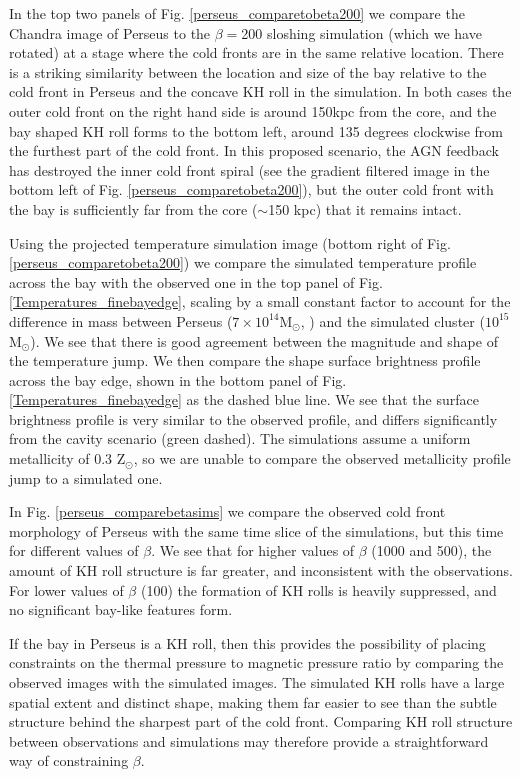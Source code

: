 \documentclass[useAMS,usenatbib]{mn2e}
\begin{document}
In the top two panels of Fig. \ref{perseus_comparetobeta200} we compare the
Chandra image of Perseus to the $\beta=$200 sloshing simulation (which we have rotated) at a
stage where the cold fronts are in the same relative location. There is a
striking similarity between the location and size of the bay relative to the
cold front in Perseus and the concave KH roll in the simulation. In both cases the
outer cold front on the right hand side is around 150kpc from the core, and the
bay shaped KH roll forms to the bottom left, around 135 degrees clockwise from the
furthest part of the cold front. In this proposed scenario, the AGN feedback has
destroyed the inner cold front spiral (see the gradient filtered image in the
bottom left of Fig. \ref{perseus_comparetobeta200}), but the outer cold front
with the bay is sufficiently far from the core ($\sim$150 kpc) that it remains
intact. 



Using the projected temperature simulation image (bottom right of Fig.
\ref{perseus_comparetobeta200}) we compare the simulated temperature profile
across the bay with the observed one in the top panel of Fig.
\ref{Temperatures_finebayedge}, scaling by a small constant factor to account for the
difference in mass between Perseus ($7\times10^{14}$M$_{\odot}$, \citealt{Simionescu2011}) and the simulated cluster ($10^{15}$M$_{\odot}$). We see that there
is good agreement between the magnitude and shape of the temperature jump. We
then compare the shape surface brightness profile across the bay edge,
shown in the bottom panel of Fig. \ref{Temperatures_finebayedge} as the dashed
blue line. We see that the surface brightness profile is very similar to the
observed profile, and differs significantly from the cavity scenario (green
dashed). The simulations assume a uniform metallicity of 0.3 Z$_{\odot}$, so we are unable to compare the observed metallicity profile jump to a simulated one.


In Fig. \ref{perseus_comparebetasims} we compare the observed cold front
morphology of Perseus with the same time slice of the simulations, but this time
for different values of $\beta$. We see that for higher values of $\beta$ (1000
and 500), the amount of KH roll structure is far greater, and inconsistent with the
observations. For lower values of $\beta$ (100) the formation of KH rolls is
heavily suppressed, and no significant bay-like features form. 

If the bay in Perseus is a KH roll, then this provides the possibility of placing
constraints on the thermal pressure to magnetic pressure ratio by comparing the
observed images with the simulated images. The simulated KH rolls have a large
spatial extent and distinct shape, making them far easier to see than the subtle
structure behind the sharpest part of the cold front. Comparing KH roll structure
between observations and simulations may therefore provide a straightforward way
of constraining $\beta$.
\end{document}
